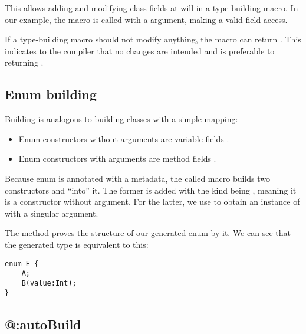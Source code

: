 \documentclass{haxe}
\begin{document}
This allows adding and modifying class fields at will in a type-building macro. In our example, the macro is called with a  argument, making  a valid field access.

If a type-building macro should not modify anything, the macro can return . This indicates to the compiler that no changes are intended and is preferable to returning .



\subsection{Enum building}
\label{macro-enum-building}

Building  is analogous to building classes with a simple mapping:

\begin{itemize}
	\item Enum constructors without arguments are variable fields .
	\item Enum constructors with arguments are method fields .
\end{itemize}



Because enum  is annotated with a  metadata, the called macro builds two constructors  and  ``into'' it. The former is added with the kind being , meaning it is a constructor without argument. For the latter, we use  to obtain an instance of  with a singular  argument.

The  method proves the structure of our generated enum by  it. We can see that the generated type is equivalent to this:

\begin{lstlisting}
enum E {
	A;
	B(value:Int);
}
\end{lstlisting}


\subsection{@:autoBuild}
\label{macro-auto-build}
\end{document}
